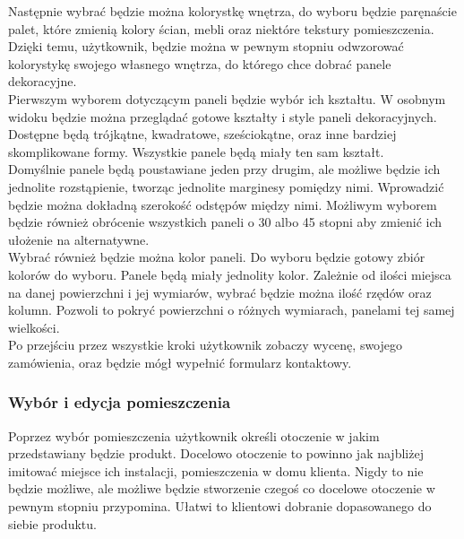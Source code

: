 \documentclass{article} %
\begin{document}
        Następnie wybrać będzie można kolorystkę wnętrza, do wyboru będzie paręnaście palet, które zmienią kolory ścian, mebli oraz niektóre tekstury pomieszczenia. Dzięki temu, użytkownik, będzie można w pewnym stopniu odwzorować kolorystykę swojego własnego wnętrza, do którego chce dobrać panele dekoracyjne.
        \\
        
        Pierwszym wyborem dotyczącym paneli będzie wybór ich kształtu. W osobnym widoku będzie można przeglądać gotowe kształty i style paneli dekoracyjnych. Dostępne będą trójkątne, kwadratowe, sześciokątne, oraz inne bardziej skomplikowane formy. Wszystkie panele będą miały ten sam kształt.
        \\
        
        Domyślnie panele będą poustawiane jeden przy drugim, ale możliwe będzie ich jednolite rozstąpienie, tworząc jednolite marginesy pomiędzy nimi. Wprowadzić będzie można dokładną szerokość odstępów między nimi. Możliwym wyborem będzie również obrócenie wszystkich paneli o 30 albo 45 stopni aby zmienić ich ułożenie na alternatywne.
        \\
        
        Wybrać również będzie można kolor paneli. Do wyboru będzie gotowy zbiór kolorów do wyboru. Panele będą miały jednolity kolor. Zależnie od ilości miejsca na danej powierzchni i jej wymiarów, wybrać będzie można ilość rzędów oraz kolumn. Pozwoli to pokryć powierzchni o różnych wymiarach, panelami tej samej wielkości.
        \\
        
        Po przejściu przez wszystkie kroki użytkownik zobaczy wycenę, swojego zamówienia, oraz będzie mógł wypełnić formularz kontaktowy.
        \\
    
        \subsubsection{Wybór i edycja pomieszczenia}
        Poprzez wybór pomieszczenia użytkownik określi otoczenie w jakim przedstawiany będzie produkt. Docelowo otoczenie to powinno jak najbliżej imitować miejsce ich instalacji, pomieszczenia w domu klienta. Nigdy to nie będzie możliwe, ale możliwe będzie stworzenie czegoś co docelowe otoczenie w pewnym stopniu przypomina. Ułatwi to klientowi dobranie dopasowanego do siebie produktu.
        \\
        
\end{document}
